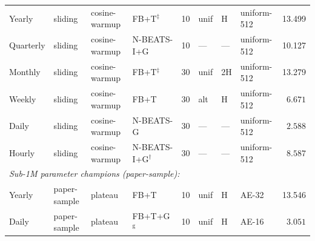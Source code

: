 \begin{table}[h]
{\begin{tabular}{@{}llllllllr@{}}
    \midrule
    Yearly    & sliding      & cosine-warmup & FB+T$^{\ddag}$        & 10 & unif        & H    & uniform-512 & 13.499 \\
    Quarterly & sliding      & cosine-warmup & N-BEATS-I+G           & 10 & ---         & ---  & uniform-512 & 10.127 \\
    Monthly   & sliding      & cosine-warmup & FB+T$^{\ddag}$        & 30 & unif        & 2H   & uniform-512 & 13.279 \\
    Weekly    & sliding      & cosine-warmup & FB+T                  & 30 & alt         & H    & uniform-512 & $\phantom{0}6.671$ \\
    Daily     & sliding      & cosine-warmup & N-BEATS-G             & 30 & ---         & ---  & uniform-512 & $\phantom{0}2.588$ \\
    Hourly    & sliding      & cosine-warmup & N-BEATS-I+G$^{\dag}$  & 30 & ---         & ---  & uniform-512 & $\phantom{0}8.587$ \\
    \midrule
    \multicolumn{9}{l}{\textit{Sub-1M parameter champions (paper-sample):}} \\
    Yearly    & paper-sample & plateau       & FB+T                  & 10 & unif        & H    & AE-32       & 13.546 \\
    Daily     & paper-sample & plateau       & FB+T+G$^{\mathrm{g}}$ & 10 & unif        & H    & AE-16       & $\phantom{0}3.051$ \\
    \bottomrule
  \end{tabular}}
\end{table}